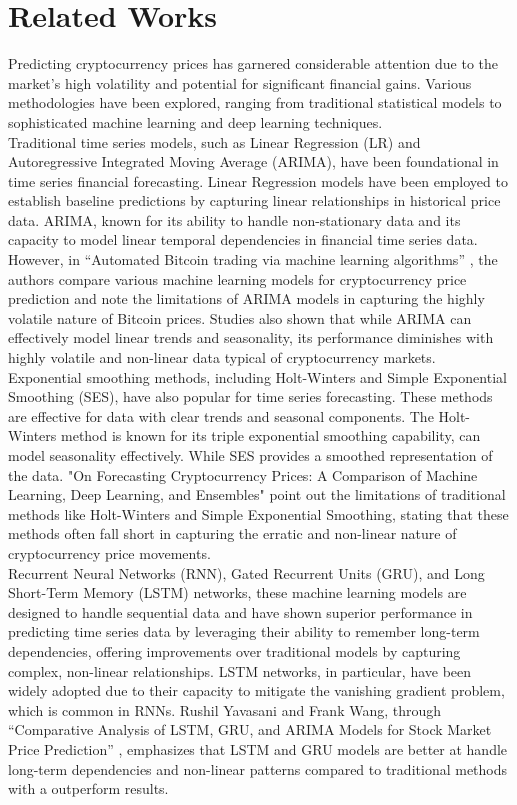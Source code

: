\documentclass{ieeeojies}
\begin{document}
\section{Related Works}
Predicting cryptocurrency prices has garnered considerable attention due to the market's high volatility and potential for significant financial gains. Various methodologies have been explored, ranging from traditional statistical models to sophisticated machine learning and deep learning techniques.\\
Traditional time series models, such as Linear Regression (LR) and Autoregressive Integrated Moving Average (ARIMA), have been foundational in time series financial forecasting. Linear Regression models have been employed to establish baseline predictions by capturing linear relationships in historical price data. ARIMA, known for its ability to handle non-stationary data and its capacity to model linear temporal dependencies in financial time series data. However, in “Automated Bitcoin trading via machine learning algorithms” \cite{b1}, the authors compare various machine learning models for cryptocurrency price prediction and note the limitations of ARIMA models in capturing the highly volatile nature of Bitcoin prices. Studies also shown that while ARIMA can effectively model linear trends and seasonality, its performance diminishes with highly volatile and non-linear data typical of cryptocurrency markets.\\
Exponential smoothing methods, including Holt-Winters and Simple Exponential Smoothing (SES), have also popular for time series forecasting. These methods are effective for data with clear trends and seasonal components. The Holt-Winters method is known for its triple exponential smoothing capability, can model seasonality effectively. While SES provides a smoothed representation of the data. "On Forecasting Cryptocurrency Prices: A Comparison of Machine Learning, Deep Learning, and Ensembles" \cite{b2} point out the limitations of traditional methods like Holt-Winters and Simple Exponential Smoothing, stating that these methods often fall short in capturing the erratic and non-linear nature of cryptocurrency price movements.\\
Recurrent Neural Networks (RNN), Gated Recurrent Units (GRU), and Long Short-Term Memory (LSTM) networks, these machine learning models are designed to handle sequential data and have shown superior performance in predicting time series data by leveraging their ability to remember long-term dependencies, offering improvements over traditional models by capturing complex, non-linear relationships. LSTM networks, in particular, have been widely adopted due to their capacity to mitigate the vanishing gradient problem, which is common in RNNs. Rushil Yavasani and Frank Wang, through “Comparative Analysis of LSTM, GRU, and ARIMA Models for Stock Market Price Prediction” \cite{b3}, emphasizes that LSTM and GRU models are better at handle long-term dependencies and non-linear patterns compared to traditional methods with a outperform results.\\
\end{document}
